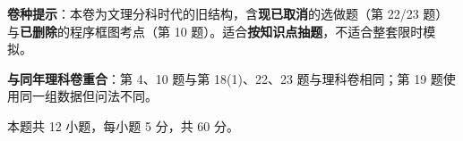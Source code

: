 

\begin{gknotice}
\textbf{ 卷种提示}：本卷为文理分科时代的旧结构，含\textbf{现已取消}的选做题（第 22/23 题）与\textbf{已删除}的程序框图考点（第 10 题）。适合\textbf{按知识点抽题}，不适合整套限时模拟。

\textbf{与同年理科卷重合}：第 4、10 题与第 18(1)、22、23 题与理科卷相同；第 19 题使用同一组数据但问法不同。
\end{gknotice}

\par\medskip


\begin{gktip}
本题共 12 小题，每小题 5 分，共 60 分。
\end{gktip}

